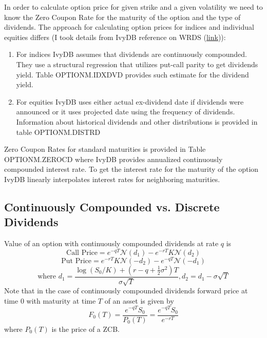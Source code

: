 \documentclass[12pt]{article}
\begin{document}
In order to calculate option price for given strike and a given volatility we need to know the Zero Coupon Rate for the maturity of the option and the type of dividends. The approach for calculating option prices for indices and individual equities differs (I took details from IvyDB reference on WRDS (\href{https://wrds-www.wharton.upenn.edu/documents/755/IvyDB_US_Reference_Manual.pdf}{link})):
\begin{enumerate}
	\item For indices IvyDB assumes that dividends are continuously compounded. They use a structural regression that utilizes put-call parity to get dividends yield. Table OPTIONM.IDXDVD provides such estimate for the dividend yield. 
	\item For equities IvyDB uses either actual ex-dividend date if dividends were announced or it uses projected date using the frequency of dividends. Information about historical dividends and other distributions is provided in table OPTIONM.DISTRD
\end{enumerate}


Zero Coupon Rates for standard maturities is provided in Table OPTIONM.ZEROCD where IvyDB provides annualized continuously compounded interest rate. To get the interest rate for the maturity of the option IvyDB linearly interpolates interest rates for neighboring maturities. 

\subsection{Continuously Compounded vs. Discrete Dividends}

Value of an option with continuously compounded dividends at rate $q$ is
\[\text{Call Price} = e^{-qT}\mathcal{N}(d_1)-e^{-rT}K\mathcal{N}(d_2)\]
\[\text{Put Price} = e^{-rT}K\mathcal{N}(-d_2) - e^{-qT}\mathcal{N}(-d_1)\]
\[\text{where } d_1 = \frac{\log(S_0/K) + (r - q + \frac{1}{2}\sigma^2)T}{\sigma\sqrt{T}}, d_2 = d_1 - \sigma\sqrt{T}\]
Note that in the case of continuously compounded dividends forward price at time $0$ with maturity at time $T$ of an asset is given by
\[F_0(T) = \frac{e^{-qT}S_0}{P_0(T)} = \frac{e^{-qT}S_0}{e^{-rT}}\]
where $P_0(T)$ is the price of a ZCB. 
\end{document}
